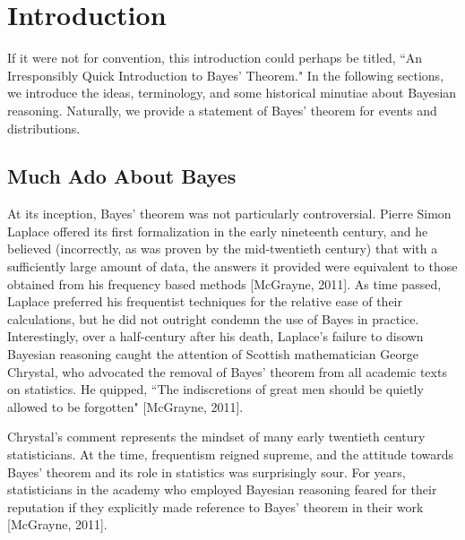 \documentclass[12pt,twoside]{reedthesis}
\begin{document}
    \chapter*{Introduction}

	If it were not for convention, this introduction could perhaps be titled, ``An Irresponsibly Quick Introduction to Bayes' Theorem." In the following sections, we introduce the ideas, terminology, and some historical minutiae about Bayesian reasoning. Naturally, we provide a statement of Bayes' theorem for events and distributions.
	\section{Much Ado About Bayes}
	At its inception, Bayes' theorem was not particularly controversial. Pierre Simon Laplace offered its first formalization in the early nineteenth century, and he believed (incorrectly, as was proven by the mid-twentieth century) that with a sufficiently large amount of data, the answers it provided were equivalent to those obtained from his frequency based methods [McGrayne, 2011]. 
	As time passed, Laplace preferred his frequentist techniques for the relative ease of their calculations, but he did not outright condemn the use of Bayes in practice. Interestingly, over a half-century after his death, Laplace's failure to disown Bayesian reasoning caught the attention of Scottish mathematician George Chrystal, who advocated the removal of Bayes' theorem from all academic texts on statistics. He quipped, ``The indiscretions of great men should be quietly allowed to be forgotten" [McGrayne, 2011].
	
	Chrystal's comment represents the mindset of many early twentieth century statisticians. At the time, frequentism reigned supreme, and the attitude towards Bayes' theorem and its role in statistics was surprisingly sour. For years, statisticians in the academy who employed Bayesian reasoning feared for their reputation if they explicitly made reference to Bayes' theorem in their work [McGrayne, 2011]. 
	
\end{document}
